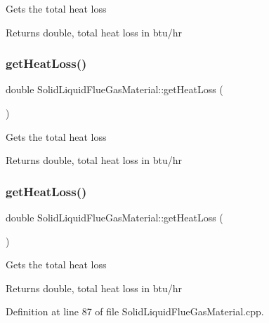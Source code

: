 Gets the total heat loss \begin{DoxyReturn}{Returns}
double, total heat loss in btu/hr 
\end{DoxyReturn}
\mbox{\label{class_solid_liquid_flue_gas_material_af7d36673e49f9b5eb631fc04227883d6}} 
\subsubsection{\texorpdfstring{get\+Heat\+Loss()}{getHeatLoss()}\hspace{0.1cm}{\footnotesize\ttfamily [2/3]}}
{\footnotesize\ttfamily double Solid\+Liquid\+Flue\+Gas\+Material\+::get\+Heat\+Loss (\begin{DoxyParamCaption}{ }\end{DoxyParamCaption})}

Gets the total heat loss \begin{DoxyReturn}{Returns}
double, total heat loss in btu/hr 
\end{DoxyReturn}
\mbox{\label{class_solid_liquid_flue_gas_material_af7d36673e49f9b5eb631fc04227883d6}} 
\subsubsection{\texorpdfstring{get\+Heat\+Loss()}{getHeatLoss()}\hspace{0.1cm}{\footnotesize\ttfamily [3/3]}}
{\footnotesize\ttfamily double Solid\+Liquid\+Flue\+Gas\+Material\+::get\+Heat\+Loss (\begin{DoxyParamCaption}{ }\end{DoxyParamCaption})}

Gets the total heat loss \begin{DoxyReturn}{Returns}
double, total heat loss in btu/hr 
\end{DoxyReturn}


Definition at line 87 of file Solid\+Liquid\+Flue\+Gas\+Material.\+cpp.

